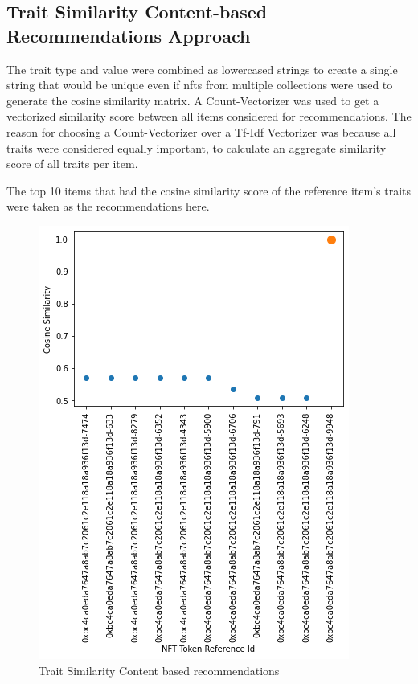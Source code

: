 \documentclass[conference]{IEEEtran}
\begin{document}
\subsection{Trait Similarity Content-based Recommendations Approach}

The trait type and value were combined as lowercased strings to create a single string that would be unique even if \gls{nft}s from multiple collections were used to generate the cosine similarity matrix. A Count-Vectorizer was used to get a vectorized similarity score between all items considered for recommendations. The reason for choosing a Count-Vectorizer over a Tf-Idf Vectorizer was because all traits were considered equally important, to calculate an aggregate similarity score of all traits per item.

The top 10 items that had the cosine similarity score of the reference item's traits were taken as the recommendations here.

\begin{figure}[htbp]
\centerline{\includegraphics[width=\linewidth]{images/Cosine_Similarities_of_Recommended_NFTs-Trait_Content_Based_Recomendations_Model.png}}
\caption{Trait Similarity Content based recommendations}
\label{fig:trait-content-output}
\end{figure}
\end{document}
